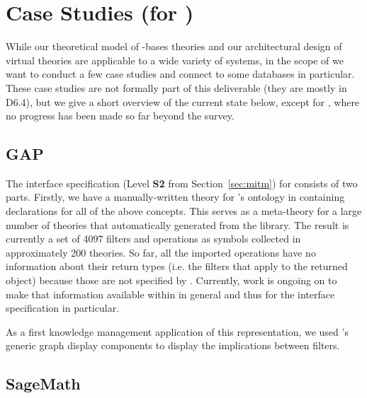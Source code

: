 \section{Case Studies  (for )}\label{sec:cases}

While our theoretical model of \DKS-bases theories and our architectural design of virtual theories are applicable to a wide variety of systems, in the scope of \pn we want to conduct a few case studies and connect to some databases in particular.
These case studies are not formally part of this deliverable (they are mostly in D6.4), but we give a short overview of the current state below, except for \FindStat, where no progress has been made so far beyond the survey.

\subsection{GAP}\label{sec:gap}

The interface specification (Level \textbf{S2} from Section~\ref{sec:mitm}) for \GAP consists of two parts.
Firstly, we have a manually-written theory for \GAP's ontology in \MMT containing declarations for all of the above concepts.
This serves as a meta-theory for a large number of theories that automatically generated from the \GAP library.
The result is currently a set of 4097 filters and operations as \MMT symbols collected in approximately 200 theories.
So far, all the imported operations have no information about their return types (i.e. the filters that apply to the returned object) because those are not specified by \GAP.
Currently, work is ongoing on \GAP to make that information available within \GAP in general and thus for the interface specification in particular.

As a first knowledge management application of this representation, we used \MMT's generic graph display components to display the implications between \GAP filters.

\subsection{SageMath}\label{sec:sage}


